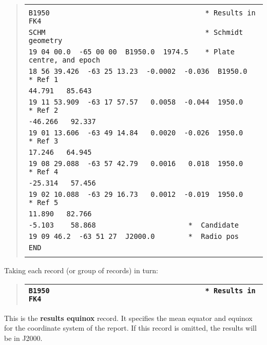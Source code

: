 \documentclass[twoside,11pt]{article}
\renewcommand{\_}{\texttt{\symbol{95}}}
\begin{document}
\begin{quote}
\begin{small}
\begin{tabular}{|l|}
\hline
\\
\verb|B1950                                     * Results in FK4| \\
\verb|SCHM                                      * Schmidt geometry| \\
\verb|19 04 00.0  -65 00 00  B1950.0  1974.5    * Plate centre, and epoch| \\
\verb|18 56 39.426  -63 25 13.23  -0.0002  -0.036  B1950.0  * Ref 1| \\
\verb|44.791   85.643| \\
\verb|19 11 53.909  -63 17 57.57   0.0058  -0.044  1950.0   * Ref 2| \\
\verb|-46.266   92.337| \\
\verb|19 01 13.606  -63 49 14.84   0.0020  -0.026  1950.0   * Ref 3| \\
\verb|17.246   64.945| \\
\verb|19 08 29.088  -63 57 42.79   0.0016   0.018  1950.0   * Ref 4| \\
\verb|-25.314   57.456| \\
\verb|19 02 10.088  -63 29 16.73   0.0012  -0.019  1950.0   * Ref 5| \\
\verb|11.890   82.766| \\
\verb|-5.103    58.868                      *  Candidate| \\
\verb|19 09 46.2  -63 51 27  J2000.0        *  Radio pos| \\
\verb|END| \\
\\
\hline
\end{tabular}
\end{small}
\end{quote}

Taking each record (or group of records) in turn:

\begin{quote}
\begin{tabular}{|l|}
\hline
\verb|B1950                                     * Results in FK4| \\
\hline
\end{tabular}
\end{quote}

This is the \textbf{results equinox} record.  It specifies the mean
equator and equinox for the coordinate system of the report.  If this
record is omitted, the results will be in J2000.
\end{document}
